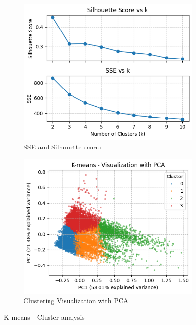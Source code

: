 \begin{figure}[H]
    \centering
    \begin{subfigure}[b]{0.42\textwidth}
        \centering
        \includegraphics[width=\textwidth]{plots/sse_silh_kmeans_def.png}
        \caption{SSE and Silhouette scores}
        \label{fig:sse_silh_kmeans}
    \end{subfigure}
    \begin{subfigure}[b]{0.42\textwidth}
        \centering
        \includegraphics[width=\textwidth]{plots/kmeans_clusters.png}
        \caption{Clustering Visualization with PCA}
        \label{fig:kmeans_visualization}
    \end{subfigure}
    \caption{K-means - Cluster analysis}
    \label{fig:subplots_kmeans}
\end{figure}
